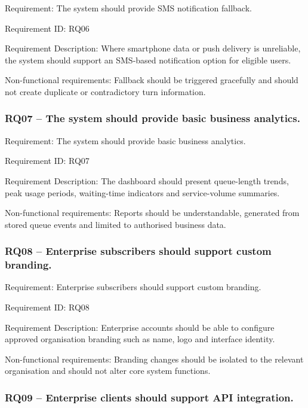 \documentclass[
]{article}
\begin{document}
Requirement: The system should provide SMS notification fallback.

Requirement ID: RQ06

Requirement Description: Where smartphone data or push delivery is
unreliable, the system should support an SMS-based notification option
for eligible users.

Non-functional requirements: Fallback should be triggered gracefully and
should not create duplicate or contradictory turn information.

\subsubsection{RQ07 -- The system should provide basic business
analytics.}\label{rq07-the-system-should-provide-basic-business-analytics.}

Requirement: The system should provide basic business analytics.

Requirement ID: RQ07

Requirement Description: The dashboard should present queue-length
trends, peak usage periods, waiting-time indicators and service-volume
summaries.

Non-functional requirements: Reports should be understandable, generated
from stored queue events and limited to authorised business data.

\subsubsection{RQ08 -- Enterprise subscribers should support custom
branding.}\label{rq08-enterprise-subscribers-should-support-custom-branding.}

Requirement: Enterprise subscribers should support custom branding.

Requirement ID: RQ08

Requirement Description: Enterprise accounts should be able to configure
approved organisation branding such as name, logo and interface
identity.

Non-functional requirements: Branding changes should be isolated to the
relevant organisation and should not alter core system functions.

\subsubsection{RQ09 -- Enterprise clients should support API
integration.}\label{rq09-enterprise-clients-should-support-api-integration.}
\end{document}
